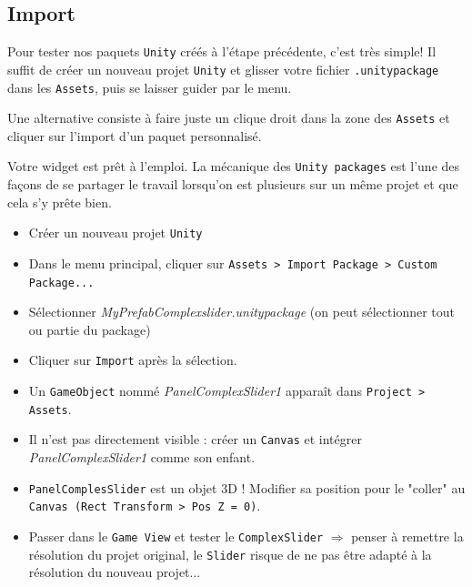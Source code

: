 \documentclass[a4paper,10pt]{article}
\newenvironment{solution}%
{\begin{tcolorbox}[breakable,colback=red!5!white,colframe=red!75!black,title=Solution]}%
{\end{tcolorbox}}
\newenvironment{info}%
{\begin{tcolorbox}[breakable,colback=green!5!white,colframe=green!75!black,title=Information]}%
{\end{tcolorbox}}
\begin{document}
\subsection{Import}

Pour tester nos paquets \texttt{Unity} créés à l'étape précédente, c'est très simple! Il suffit de créer un nouveau projet \texttt{Unity} et glisser votre fichier \texttt{.unitypackage} dans les \texttt{Assets}, puis se laisser guider par le menu.

\begin{info}
Une alternative consiste  à faire juste un clique droit dans la zone des \texttt{Assets} et cliquer sur l'import d'un paquet personnalisé.
\end{info}

Votre widget est prêt à l'emploi. La mécanique des \texttt{Unity packages} est l'une des façons de se partager le travail lorsqu'on est plusieurs sur un même projet et que cela s'y prête bien. 

\ifversionenseignant
\begin{solution}
	\begin{itemize}
		\item Créer un nouveau projet \texttt{Unity}
		\item Dans le menu principal, cliquer sur \texttt{Assets > Import Package > Custom Package...}
		\item Sélectionner \textit{MyPrefabComplexslider.unitypackage} (on peut sélectionner tout ou partie du package)
		\item Cliquer sur \texttt{Import} après la sélection.
		\item Un \texttt{GameObject} nommé \textit{PanelComplexSlider1} apparaît dans \texttt{Project > Assets}.		
		\item Il n'est pas directement visible : créer un \texttt{Canvas} et intégrer \textit{PanelComplexSlider1} comme son enfant.		
		\item \texttt{PanelComplesSlider} est un objet 3D ! Modifier sa position pour le "coller" au \texttt{Canvas (Rect Transform > Pos Z = 0)}.		
		\item Passer dans le \texttt{Game View} et tester le \texttt{ComplexSlider} $\Rightarrow$ penser à remettre la résolution du projet original, le \texttt{Slider} risque de ne pas être adapté à la résolution du nouveau projet...		
	\end{itemize}

\end{solution}
\fi 
\end{document}
